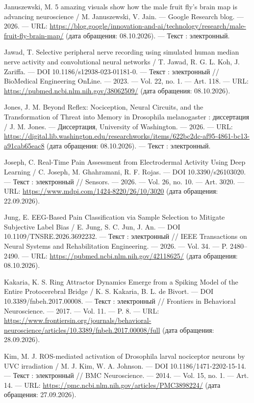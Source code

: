 \begin{list}{}{\setlength{\leftmargin}{10mm}\setlength{\labelwidth}{8mm}\setlength{\labelsep}{2mm}\setlength{\itemsep}{0pt}\setlength{\parsep}{0pt}\setlength{\topsep}{0pt}}
\item[163.] Januszewski, M. 5 amazing visuals show how the male fruit fly's brain map is advancing neuroscience / M. Januszewski, V. Jain. — Google Research blog. — 2026. — URL: \url{https://blog.google/innovation-and-ai/technology/research/male-fruit-fly-brain-map/} (дата обращения: 08.10.2026). — Текст : электронный.
\item[164.] Jawad, T. Selective peripheral nerve recording using simulated human median nerve activity and convolutional neural networks / T. Jawad, R. G. L. Koh, J. Zariffa. — DOI 10.1186/s12938-023-01181-0. — Текст : электронный // BioMedical Engineering OnLine. — 2023. — Vol. 22, no. 1. — Art. 118. — URL: \url{https://pubmed.ncbi.nlm.nih.gov/38062509/} (дата обращения: 08.10.2026).
\item[165.] Jones, J. M. Beyond Reflex: Nociception, Neural Circuits, and the Transformation of Threat into Memory in Drosophila melanogaster : диссертация / J. M. Jones. — Диссертация, University of Washington. — 2026. — URL: \url{https://digital.lib.washington.edu/researchworks/items/622bc2dc-af95-4861-bc13-a91cab65eac8} (дата обращения: 08.10.2026). — Текст : электронный.
\item[166.] Joseph, C. Real-Time Pain Assessment from Electrodermal Activity Using Deep Learning / C. Joseph, M. Ghahramani, R. F. Rojas. — DOI 10.3390/s26103020. — Текст : электронный // Sensors. — 2026. — Vol. 26, no. 10. — Art. 3020. — URL: \url{https://www.mdpi.com/1424-8220/26/10/3020} (дата обращения: 22.09.2026).
\item[167.] Jung, E. EEG-Based Pain Classification via Sample Selection to Mitigate Subjective Label Bias / E. Jung, S. C. Jun, J. An. — DOI 10.1109/TNSRE.2026.3692232. — Текст : электронный // IEEE Transactions on Neural Systems and Rehabilitation Engineering. — 2026. — Vol. 34. — P. 2480–2490. — URL: \url{https://pubmed.ncbi.nlm.nih.gov/42118625/} (дата обращения: 08.10.2026).
\item[168.] Kakaria, K. S. Ring Attractor Dynamics Emerge from a Spiking Model of the Entire Protocerebral Bridge / K. S. Kakaria, B. L. de Bivort. — DOI 10.3389/fnbeh.2017.00008. — Текст : электронный // Frontiers in Behavioral Neuroscience. — 2017. — Vol. 11. — P. 8. — URL: \url{https://www.frontiersin.org/journals/behavioral-neuroscience/articles/10.3389/fnbeh.2017.00008/full} (дата обращения: 28.09.2026).
\item[169.] Kim, M. J. ROS-mediated activation of Drosophila larval nociceptor neurons by UVC irradiation / M. J. Kim, W. A. Johnson. — DOI 10.1186/1471-2202-15-14. — Текст : электронный // BMC Neuroscience. — 2014. — Vol. 15, no. 1. — Art. 14. — URL: \url{https://pmc.ncbi.nlm.nih.gov/articles/PMC3898224/} (дата обращения: 27.09.2026).

\end{list}
